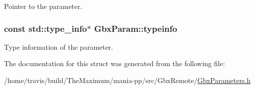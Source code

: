 Pointer to the parameter. 

\hypertarget{structGbxParam_afb3596a5ba95fda1e27a5c6b4ed517b5}{
\subsubsection[{typeinfo}]{\setlength{\rightskip}{0pt plus 5cm}const std\-::type\-\_\-info$\ast$ Gbx\-Param\-::typeinfo}}\label{structGbxParam_afb3596a5ba95fda1e27a5c6b4ed517b5}


Type information of the parameter. 



The documentation for this struct was generated from the following file\-:\begin{DoxyCompactItemize}
\item 
/home/travis/build/\-The\-Maximum/mania-\/pp/src/\-Gbx\-Remote/\hyperlink{GbxParameters_8h}{Gbx\-Parameters.\-h}\end{DoxyCompactItemize}
